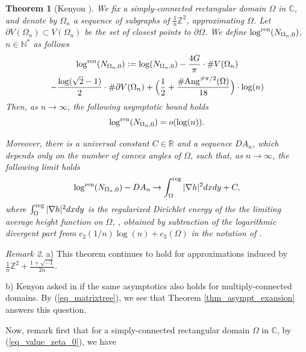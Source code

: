 \documentclass[12pt]{article}
\numberwithin{equation}{section}
\theoremstyle{theorem}
\newtheorem{thm}{Theorem}[section]
\theoremstyle{definition}
\theoremstyle{remark}
\newtheorem{rem}[thm]{Remark}
\newcommand{\imun} {\sqrt{-1}}
\newcommand{\comp}{\mathbb{C}}
\newcommand{\real}{\mathbb{R}}
\newcommand{\nat}{\mathbb{N}}
\newcommand{\integ}{\mathbb{Z}}
\begin{document}
	 \begin{thm}[{Kenyon  \cite[Theorem 1 and Corollary 2]{KenyonDet}}]\label{thm_kenyon_thm}
		We fix a simply-connected rectangular domain $\Omega$ in $\comp$, and denote by $\Omega_n$ a sequence of subgraphs of $\frac{1}{n} \integ^2$, approximating $\Omega$. 
		Let $\partial V(\Omega_n) \subset V(\Omega_n)$ be the set of closest points to $\partial \Omega$. We define $\log^{{\rm{ren}}}(N_{\Omega_n, 0})$, $n \in \nat^*$ as follows
		\begin{multline}
			\log^{{\rm{ren}}}(N_{\Omega_n, 0})
			:=
			\log(N_{\Omega_n, 0})
			-
			\frac{4G}{\pi} \cdot \# V(\Omega_n)
			\\
			-
			\frac{\log(\sqrt{2} - 1)}{2} \cdot \# \partial V(\Omega_n)
			+
			\Big(
				\frac{1}{2} + \frac{\# {\rm{Ang}}^{\neq \pi/2}(\Omega)}{18}
			\Big)
			\cdot
			\log(n)
		\end{multline}
		Then, as $n \to \infty$, the following asymptotic bound holds
		\begin{equation}
			\log^{{\rm{ren}}}(N_{\Omega_n, 0}) = o(\log(n)).
		\end{equation}
		\par Moreover, there is a universal constant $C \in \real$ and a sequence $DA_n$, which depends only on the number of convex angles of $\Omega$, such that, as $n \to \infty$, the following limit holds
		\begin{equation}
			\log^{{\rm{ren}}}(N_{\Omega_n, 0}) - DA_n \to \int_{\Omega}^{{\rm{reg}}} | \nabla h|^2 dx dy + C,
		\end{equation}
		where $\int_{\Omega}^{{\rm{reg}}} | \nabla h|^2 dx dy$ is the regularized Dirichlet energy of the the limiting average height function on $\Omega$, \cite[\S 2.3 and \S 2.4]{KenyonDet}, obtained by subtraction of the logarithmic divergent part from $c_2(1/n) \log(n) + c_3(\Omega)$ in the notation of \cite[Theorem 1]{KenyonDet}.
	\end{thm}
	\begin{rem}\label{rem_ken_shift_latt}
		a)
		This theorem continues to hold for approximations induced by $\frac{1}{n}\integ^2 + \frac{1 + \imun}{2n}$.
		\par 
		b)
		Kenyon asked in \cite[\S 8, question 2]{KenyonDet} if the same asymptotics also holds for multiply-connected domains. By (\ref{eq_matrixtree}), we see that Theorem \ref{thm_asympt_exansion} answers this question.
	\end{rem}
	Now, remark first that for a simply-connected rectangular domain $\Omega$ in $\comp$, by (\ref{eq_value_zeta_0}), we have
\end{document}

